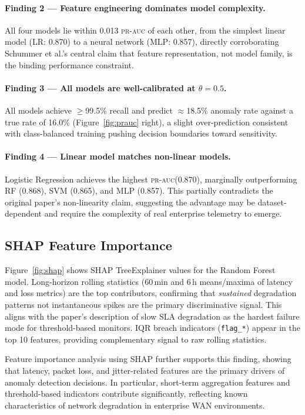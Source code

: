 \documentclass{article}
\newcommand{\prauc}{\textsc{pr-auc}\xspace}
\begin{document}
\paragraph{Finding 2 — Feature engineering dominates model complexity.}
All four models lie within 0.013 \prauc of each other, from the simplest
linear model (LR: 0.870) to a neural network (MLP: 0.857), directly
corroborating Schummer et al.'s central claim that feature representation,
not model family, is the binding performance constraint.

\paragraph{Finding 3 — All models are well-calibrated at $\theta=0.5$.}
All models achieve $\geq$99.5\% recall and predict $\approx$18.5\% anomaly rate
against a true rate of 16.0\% (Figure~\ref{fig:prauc} right), a slight
over-prediction consistent with class-balanced training pushing decision
boundaries toward sensitivity.

\paragraph{Finding 4 — Linear model matches non-linear models.}
Logistic Regression achieves the highest \prauc (0.870), marginally outperforming
RF (0.868), SVM (0.865), and MLP (0.857). This partially contradicts the original
paper's non-linearity claim, suggesting the advantage may be dataset-dependent
and require the complexity of real enterprise telemetry to emerge.

\subsection{SHAP Feature Importance}

Figure~\ref{fig:shap} shows SHAP TreeExplainer values for the Random Forest model.
Long-horizon rolling statistics (60\,min and 6\,h means/maxima of latency and
loss metrics) are the top contributors, confirming that \emph{sustained}
degradation patterns not instantaneous spikes are the primary discriminative
signal.
This aligns with the paper's description of slow SLA degradation as the hardest
failure mode for threshold-based monitors.
IQR breach indicators (\texttt{flag\_*}) appear in the top 10 features, providing
complementary signal to raw rolling statistics.

Feature importance analysis using SHAP further supports this finding, showing that 
latency, packet loss, and jitter-related features are the primary drivers of anomaly 
detection decisions. In particular, short-term aggregation features and threshold-based 
indicators contribute significantly, reflecting known characteristics of network 
degradation in enterprise WAN environments.
\end{document}

